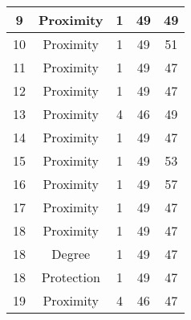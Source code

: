 \documentclass[results.tex]{subfiles}
\begin{document}
\begin{center}
\begin{tabular}{| c || c | c | c | c |}
            \hline
            9                       & Proximity                    & 1                      & 49                      & 49                   \\
            \hline
            10                      & Proximity                    & 1                      & 49                      & 51                   \\
            \hline
            11                      & Proximity                    & 1                      & 49                      & 47                   \\
            \hline
            12                      & Proximity                    & 1                      & 49                      & 47                   \\
            \hline
            13                      & Proximity                    & 4                      & 46                      & 49                   \\
            \hline
            14                      & Proximity                    & 1                      & 49                      & 47                   \\
            \hline
            15                      & Proximity                    & 1                      & 49                      & 53                   \\
            \hline
            16                      & Proximity                    & 1                      & 49                      & 57                   \\
            \hline
            17                      & Proximity                    & 1                      & 49                      & 47                   \\
            \hline
            18                      & Proximity                    & 1                      & 49                      & 47                   \\
            \hline
            18                      & Degree                       & 1                      & 49                      & 47                   \\
            \hline
            18                      & Protection                   & 1                      & 49                      & 47                   \\
            \hline
            19                      & Proximity                    & 4                      & 46                      & 47                   \\

\end{tabular}
\end{center}
\end{document}
